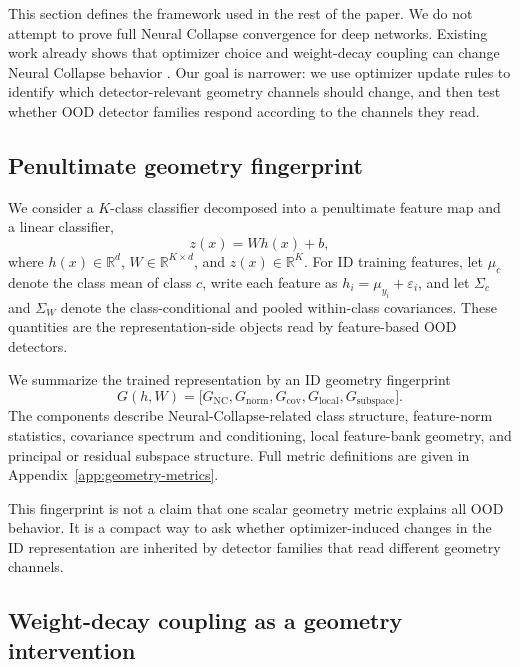This section defines the framework used in the rest of the paper. We do not
attempt to prove full Neural Collapse convergence for deep networks. Existing
work already shows that optimizer choice and weight-decay coupling can change
Neural Collapse behavior \citep{zhao2026optimizer,loshchilov2019decoupled}. Our
goal is narrower: we use optimizer update rules to identify which
detector-relevant geometry channels should change, and then test whether OOD
detector families respond according to the channels they read.

\subsection{Penultimate geometry fingerprint}
\label{subsec:setup-claim-boundary}

We consider a \(K\)-class classifier decomposed into a penultimate feature map
and a linear classifier,
\begin{equation}
    z(x)=Wh(x)+b,
    \label{eq:classifier-decomposition}
\end{equation}
where \(h(x)\in\mathbb{R}^d\), \(W\in\mathbb{R}^{K\times d}\), and
\(z(x)\in\mathbb{R}^K\). For ID training features, let \(\mu_c\) denote the
class mean of class \(c\), write each feature as
\(h_i=\mu_{y_i}+\varepsilon_i\), and let \(\Sigma_c\) and \(\Sigma_W\) denote
the class-conditional and pooled within-class covariances. These quantities are
the representation-side objects read by feature-based OOD detectors.

We summarize the trained representation by an ID geometry fingerprint
\begin{equation}
    G(h,W)
    =
    \big[
    G_{\mathrm{NC}},
    G_{\mathrm{norm}},
    G_{\mathrm{cov}},
    G_{\mathrm{local}},
    G_{\mathrm{subspace}}
    \big].
    \label{eq:geometry-fingerprint-section3}
\end{equation}
The components describe Neural-Collapse-related class structure, feature-norm
statistics, covariance spectrum and conditioning, local feature-bank geometry,
and principal or residual subspace structure. Full metric definitions are given
in Appendix~\ref{app:geometry-metrics}.

This fingerprint is not a claim that one scalar geometry metric explains all OOD
behavior. It is a compact way to ask whether optimizer-induced changes in the ID
representation are inherited by detector families that read different geometry
channels.

\subsection{Weight-decay coupling as a geometry intervention}
\label{subsec:optimizer-update-geometry}

